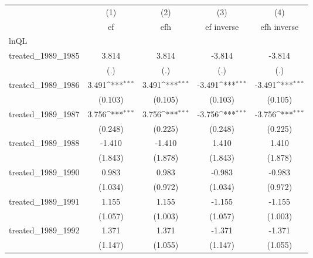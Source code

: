 {
\def\sym#1{\ifmmode^{#1}\else\(^{#1}\)\fi}
\begin{tabular}{l*{4}{c}}
\hline\hline
            &\multicolumn{1}{c}{(1)}&\multicolumn{1}{c}{(2)}&\multicolumn{1}{c}{(3)}&\multicolumn{1}{c}{(4)}\\
            &\multicolumn{1}{c}{ef}&\multicolumn{1}{c}{efh}&\multicolumn{1}{c}{ef inverse}&\multicolumn{1}{c}{efh inverse}\\
\hline
lnQL        &                     &                     &                     &                     \\
treated\_1989\_1985&       3.814         &       3.814         &      -3.814         &      -3.814         \\
            &         (.)         &         (.)         &         (.)         &         (.)         \\
[1em]
treated\_1989\_1986&       3.491\sym{***}&       3.491\sym{***}&      -3.491\sym{***}&      -3.491\sym{***}\\
            &     (0.103)         &     (0.105)         &     (0.103)         &     (0.105)         \\
[1em]
treated\_1989\_1987&       3.756\sym{***}&       3.756\sym{***}&      -3.756\sym{***}&      -3.756\sym{***}\\
            &     (0.248)         &     (0.225)         &     (0.248)         &     (0.225)         \\
[1em]
treated\_1989\_1988&      -1.410         &      -1.410         &       1.410         &       1.410         \\
            &     (1.843)         &     (1.878)         &     (1.843)         &     (1.878)         \\
[1em]
treated\_1989\_1990&       0.983         &       0.983         &      -0.983         &      -0.983         \\
            &     (1.034)         &     (0.972)         &     (1.034)         &     (0.972)         \\
[1em]
treated\_1989\_1991&       1.155         &       1.155         &      -1.155         &      -1.155         \\
            &     (1.057)         &     (1.003)         &     (1.057)         &     (1.003)         \\
[1em]
treated\_1989\_1992&       1.371         &       1.371         &      -1.371         &      -1.371         \\
            &     (1.147)         &     (1.055)         &     (1.147)         &     (1.055)         \\

\end{tabular}}
